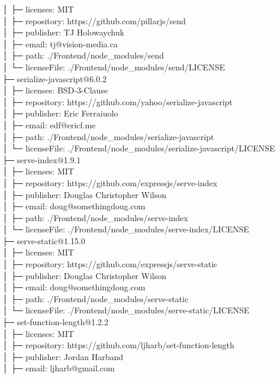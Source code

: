 │  ├─ licenses: MIT\\
│  ├─ repository: https://github.com/pillarjs/send\\
│  ├─ publisher: TJ Holowaychuk\\
│  ├─ email: tj@vision-media.ca\\
│  ├─ path: ./Frontend/node\_modules/send\\
│  └─ licenseFile: ./Frontend/node\_modules/send/LICENSE\\
├─ serialize-javascript@6.0.2\\
│  ├─ licenses: BSD-3-Clause\\
│  ├─ repository: https://github.com/yahoo/serialize-javascript\\
│  ├─ publisher: Eric Ferraiuolo\\
│  ├─ email: edf@ericf.me\\
│  ├─ path: ./Frontend/node\_modules/serialize-javascript\\
│  └─ licenseFile: ./Frontend/node\_modules/serialize-javascript/LICENSE\\
├─ serve-index@1.9.1\\
│  ├─ licenses: MIT\\
│  ├─ repository: https://github.com/expressjs/serve-index\\
│  ├─ publisher: Douglas Christopher Wilson\\
│  ├─ email: doug@somethingdoug.com\\
│  ├─ path: ./Frontend/node\_modules/serve-index\\
│  └─ licenseFile: ./Frontend/node\_modules/serve-index/LICENSE\\
├─ serve-static@1.15.0\\
│  ├─ licenses: MIT\\
│  ├─ repository: https://github.com/expressjs/serve-static\\
│  ├─ publisher: Douglas Christopher Wilson\\
│  ├─ email: doug@somethingdoug.com\\
│  ├─ path: ./Frontend/node\_modules/serve-static\\
│  └─ licenseFile: ./Frontend/node\_modules/serve-static/LICENSE\\
├─ set-function-length@1.2.2\\
│  ├─ licenses: MIT\\
│  ├─ repository: https://github.com/ljharb/set-function-length\\
│  ├─ publisher: Jordan Harband\\
│  ├─ email: ljharb@gmail.com\\
